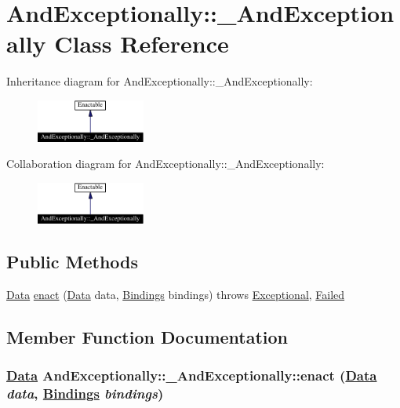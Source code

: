 \hypertarget{classAndExceptionally_1_1__AndExceptionally}{
\section{And\-Exceptionally::\_\-And\-Exceptionally  Class Reference}
\label{classAndExceptionally_1_1__AndExceptionally}
}
Inheritance diagram for And\-Exceptionally::\_\-And\-Exceptionally:\begin{figure}[H]
\begin{center}
\leavevmode
\includegraphics[width=101pt]{classAndExceptionally_1_1__AndExceptionally__inherit__graph}
\end{center}
\end{figure}
Collaboration diagram for And\-Exceptionally::\_\-And\-Exceptionally:\begin{figure}[H]
\begin{center}
\leavevmode
\includegraphics[width=101pt]{classAndExceptionally_1_1__AndExceptionally__coll__graph}
\end{center}
\end{figure}
\subsection*{Public Methods}
\begin{CompactItemize}
\item 
\hyperlink{interfaceData}{Data} \hyperlink{classAndExceptionally_1_1__AndExceptionally_a0}{enact} (\hyperlink{interfaceData}{Data} data, \hyperlink{interfaceBindings}{Bindings} bindings) throws \hyperlink{classExceptional}{Exceptional}, \hyperlink{classFailed}{Failed}
\end{CompactItemize}


\subsection{Member Function Documentation}
\hypertarget{classAndExceptionally_1_1__AndExceptionally_a0}{
\subsubsection[enact]{\setlength{\rightskip}{0pt plus 5cm}\hyperlink{interfaceData}{Data} And\-Exceptionally::\_\-And\-Exceptionally::enact (\hyperlink{interfaceData}{Data} {\em data}, \hyperlink{interfaceBindings}{Bindings} {\em bindings})}}
\label{classAndExceptionally_1_1__AndExceptionally_a0}




